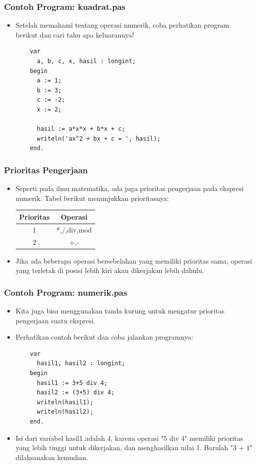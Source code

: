 \begin{frame}[fragile]
\frametitle{Contoh Program: kuadrat.pas}
\begin{itemize}
  \item Setelah memahami tentang operasi numerik, coba perhatikan program berikut dan cari tahu apa keluarannya!
  \begin{lstlisting}
    var
      a, b, c, x, hasil : longint;
    begin
      a := 1;
      b := 3;
      c := -2;
      x := 2;

      hasil := a*x*x + b*x + c;
      writeln('ax^2 + bx + c = ', hasil);
    end.
  \end{lstlisting}
\end{itemize}
\end{frame}

\begin{frame}
\frametitle{Prioritas Pengerjaan}
\begin{itemize}
  \item Seperti pada ilmu matematika, ada juga prioritas pengerjaan pada ekspresi numerik. Tabel berikut menunjukkan prioritasnya:

  \begin{tabular}{|c|c|}
  \hline Prioritas & Operasi \\
  \hline 1 & *,/,div,mod \\
  \hline 2 & +,- \\
  \hline
  \end{tabular}
  \item Jika ada beberapa operasi bersebelahan yang memiliki prioritas sama, operasi yang terletak di posisi lebih kiri akan dikerjakan lebih dahulu.
\end{itemize}
\end{frame}

\begin{frame}[fragile]
\frametitle{Contoh Program: numerik.pas}
\begin{itemize}
  \item Kita juga bisa menggunakan tanda kurung untuk mengatur prioritas pengerjaan suatu ekspresi.
  \item Perhatikan contoh berikut dan coba jalankan programnya:
  \begin{lstlisting}
    var
      hasil1, hasil2 : longint;
    begin
      hasil1 := 3+5 div 4;
      hasil2 := (3+5) div 4;
      writeln(hasil1);
      writeln(hasil2);
    end.
  \end{lstlisting}
  \item Isi dari variabel hasil1 adalah 4, karena operasi "5 div 4" memiliki prioritas yang lebih tinggi untuk dikerjakan, dan menghasilkan nilai 1. Barulah "3 + 1" dilaksanakan kemudian.
\end{itemize}
\end{frame}

